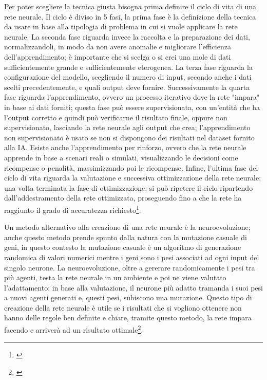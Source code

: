         Per poter scegliere la tecnica giusta bisogna prima definire il ciclo di vita di una rete neurale. Il ciclo è diviso in 5 fasi, la prima fase è la definizione della tecnica da usare in base alla tipologia di problema in cui si vuole applicare la rete neurale. La seconda fase riguarda invece la raccolta e la preparazione dei dati, normalizzandoli, in modo da non avere anomalie e migliorare l'efficienza dell'apprendimento; è importante che si scelga o si crei una mole di dati sufficientemente grande e sufficientemente eterogenea. La terza fase riguarda la configurazione del modello, scegliendo il numero di input, secondo anche i dati scelti precedentemente, e quali output deve fornire. Successivamente la quarta fase riguarda l'apprendimento, ovvero un processo iterativo dove la rete "impara" in base ai dati forniti; questa fase può essere supervisionata, con un'entità che ha l'output corretto e quindi può verificarne il risultato finale, oppure non supervisionato, lasciando la rete neurale agli output che crea; l'apprendimento non supervisionato è usato se non si dispongono dei risultati nel dataset fornito alla IA. Esiste anche l'apprendimento per rinforzo, ovvero che la rete neurale apprende in base a scenari reali o simulati, visualizzando le decisioni come ricompense o penalità, massimizzando poi le ricompense. \newline
        Infine, l'ultima fase del ciclo di vita riguarda la valutazione e successiva ottimizzazione della rete neurale; una volta terminata la fase di ottimizzazione, si può ripetere il ciclo ripartendo dall'addestramento della rete ottimizzata, proseguendo fino a che la rete ha raggiunto il grado di accuratezza richiesto\footnote{\cite{NeuralNetworks}}. 
    \par
        Un metodo alternativo alla creazione di una rete neurale è la neuroevoluzione; anche questo metodo prende spunto dalla natura con la mutazione casuale di geni, in questo contesto la mutazione casuale è un algoritmo di generazione randomica di valori numerici mentre i geni sono i pesi associati ad ogni input del singolo neurone. \newline
        La neuroevoluzione, oltre a gererare randomicamente i pesi tra più agenti, testa la rete neurale in un ambiente e poi ne viene valutato l'adattamento; in base alla valutazione, il neurone più adatto tramanda i suoi pesi a nuovi agenti generati e, questi pesi, subiscono una mutazione. \newline
        Questo tipo di creazione della rete neurale è utile se i risultati che si vogliono ottenere non hanno delle regole ben definite e chiare, tramite questo metodo, la rete impara facendo e arriverà ad un risultato ottimale\footnote{\cite{Neuroevolution}}. 
